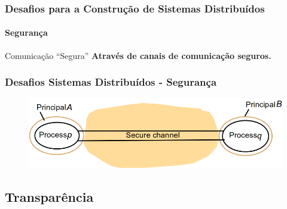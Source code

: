 \documentclass[hyperref={pdfpagelabels=false},table]{beamer}
\begin{document}
\begin{frame}
    \frametitle{Desafios para a Construção de Sistemas Distribuídos}
    \framesubtitle{Segurança}	

	\begin{block}{Comunicação ``Segura''}
         \textbf{Através de canais de comunicação \alert{seguros.}}
	\end{block}
	\frametitle{Desafios Sistemas Distribuídos - Segurança}
	\begin{figure}
	  \centering
	  \includegraphics[scale=.4]{figs/seguranca4}
	\end{figure}
\end{frame}


% 

\subsection{Transparência}
\end{document}

